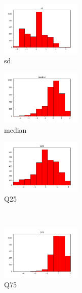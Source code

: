 \documentclass[a4paper]{article}
\begin{document}

\begin{figure}
    \centering
    \begin{subfigure}{0.32\textwidth}
        \centering
        \includegraphics[width=3.85cm]{std_0_sd}
        \caption{sd}
        \label{fig:sub_std_1}
    \end{subfigure}
    \hfill
    \begin{subfigure}{0.32\textwidth}
        \centering
        \includegraphics[width=3.85cm]{std_1_median}
        \caption{median}
        \label{fig:sub_std_2}
    \end{subfigure}
    \hfill
    \begin{subfigure}{0.32\textwidth}
        \centering
        \includegraphics[width=3.85cm]{std_2_Q25}
        \caption{Q25}
        \label{fig:sub_std_3}
    \end{subfigure}%
    \\
    \begin{subfigure}{0.32\textwidth}
        \centering
        \includegraphics[width=3.85cm]{std_3_Q75}
        \caption{Q75}
        \label{fig:sub_std_4}
    \end{subfigure}\hfill
    \begin{subfigure}{0.32\textwidth}
        \centering

\end{subfigure}
\end{figure}
\end{document}
